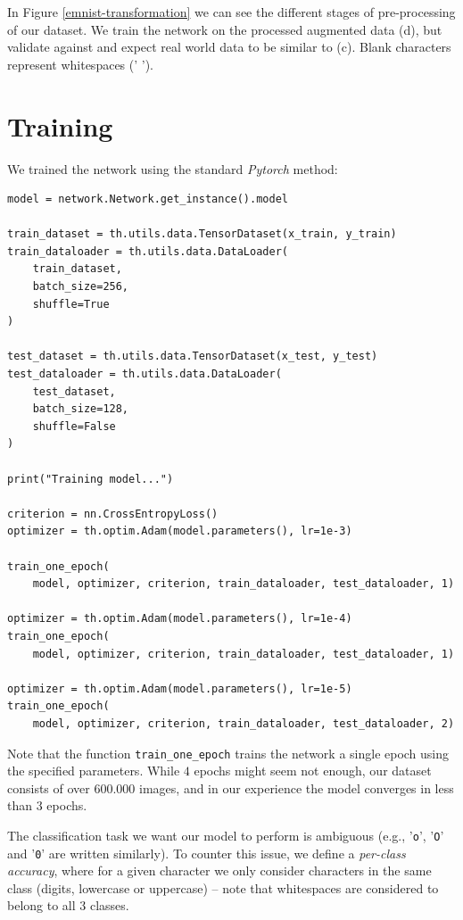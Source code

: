\documentclass[11pt, a4paper]{report}
\def\code#1{\texttt{#1}}
\begin{document}
In Figure \ref{emnist-transformation} we can see the different stages of pre-processing of our dataset. We train the network on the processed augmented data (d), but validate against and expect real world data to be similar to (c). Blank characters represent whitespaces (' ').

\section{Training}

We trained the network using the standard \textit{Pytorch} method:
\begin{verbatim}
model = network.Network.get_instance().model

train_dataset = th.utils.data.TensorDataset(x_train, y_train)
train_dataloader = th.utils.data.DataLoader(
    train_dataset,
    batch_size=256,
    shuffle=True
)

test_dataset = th.utils.data.TensorDataset(x_test, y_test)
test_dataloader = th.utils.data.DataLoader(
    test_dataset,
    batch_size=128,
    shuffle=False
)

print("Training model...")

criterion = nn.CrossEntropyLoss()
optimizer = th.optim.Adam(model.parameters(), lr=1e-3)

train_one_epoch(
    model, optimizer, criterion, train_dataloader, test_dataloader, 1)

optimizer = th.optim.Adam(model.parameters(), lr=1e-4)
train_one_epoch(
    model, optimizer, criterion, train_dataloader, test_dataloader, 1)

optimizer = th.optim.Adam(model.parameters(), lr=1e-5)
train_one_epoch(
    model, optimizer, criterion, train_dataloader, test_dataloader, 2)	
\end{verbatim}

Note that the function \code{train\_one\_epoch} trains the network a single epoch using the specified parameters. While $4$ epochs might seem not enough, our dataset consists of over $600.000$ images, and in our experience the model converges in less than $3$ epochs.

The classification task we want our model to perform is ambiguous (e.g., '\code{o}', '\code{O}' and '\code{0}' are written similarly). To counter this issue, we define a \textit{per-class accuracy}, where for a given character we only consider characters in the same class (digits, lowercase or uppercase) -- note that whitespaces are considered to belong to all $3$ classes.
\end{document}
